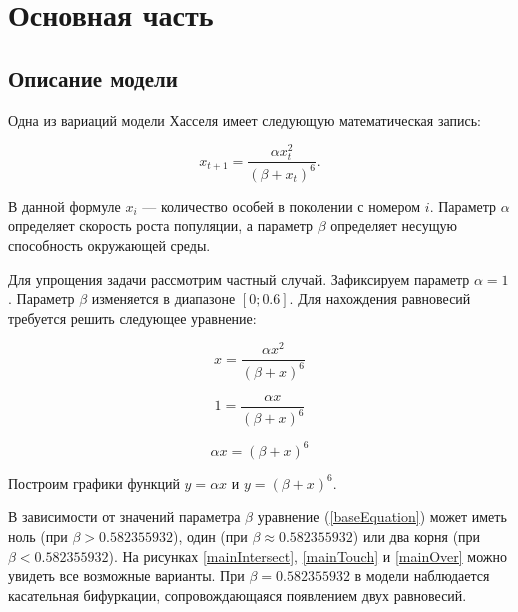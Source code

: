 \section{Основная часть}

    \subsection{Описание модели}

        Одна из вариаций модели Хасселя \cite{densityDependenceInSingleSpeciesPopulations} имеет следующую математическая запись:

        \begin{equation}
            \label{origin}
            x_{t+1} = \frac{\alpha x_t^2}{(\beta + x_t)^6}.
        \end{equation}

        В данной формуле \(x_i\) --- количество особей в поколении с номером \(i\). Параметр \(\alpha\) определяет скорость роста популяции, а параметр \(\beta\) определяет несущую способность окружающей среды.
    
        Для упрощения задачи рассмотрим частный случай. Зафиксируем параметр \(\alpha = 1\). Параметр \(\beta\) изменяется в диапазоне \([0; 0.6]\). 
        Для нахождения равновесий требуется решить следующее уравнение:  

        \[x = \frac{\alpha x^2}{(\beta + x)^6}\]
    
        \[1 = \frac{\alpha x}{(\beta + x)^6}\]

        \begin{equation}
            \label{baseEquation}
            \alpha x = (\beta + x)^6
        \end{equation}

        Построим графики функций \(y = \alpha x\) и \(y = (\beta + x)^6\). 
        
        В зависимости от значений параметра \(\beta\) уравнение (\ref{baseEquation}) может иметь ноль (при \(\beta > 0.582355932\)), один (при \(\beta \approx 0.582355932\)) или два корня (при \(\beta < 0.582355932\)). На рисунках \ref{mainIntersect}, \ref{mainTouch} и \ref{mainOver} можно увидеть все возможные варианты. При \(\beta=0.582355932\) в модели наблюдается касательная бифуркации, сопровождающаяся появлением двух равновесий.


